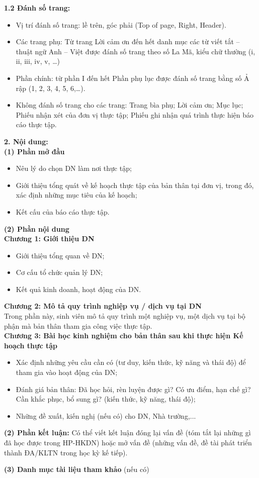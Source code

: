 \documentclass[12pt,a4paper]{article}
\begin{document}
\noindent\textbf{1.2 Đánh số trang:}
\begin{itemize}
    \item[-] Vị trí đánh số trang: lề trên, góc phải (Top of page, Right, Header).
    \item[-] Các trang phụ: Từ trang Lời cảm ơn đến hết danh mục các từ viết tắt – thuật ngữ Anh – Việt được đánh số trang theo số La Mã, kiểu chữ thường (i, ii, iii, iv, v, …)
    \item[-] Phần chính: từ phần I đến hết Phần phụ lục được đánh số trang bằng số Ả rập (1, 2, 3, 4, 5, 6,…).
    \item[-] Không đánh số trang cho các trang: Trang bìa phụ; Lời cảm ơn; Mục lục; Phiếu nhận xét của đơn vị thực tập; Phiếu ghi nhận quá trình thực hiện báo cáo thực tập.
\end{itemize}

\newpage

\noindent\textbf{2. Nội dung:}\\
\textbf{(1) Phần mở đầu}
\begin{itemize}
    \item[$\circ$] Nêu lý do chọn DN làm nơi thực tập;
    \item[$\circ$] Giới thiệu tổng quát về kế hoạch thực tập của bản thân tại đơn vị, trong đó, xác định những mục tiêu của kế hoạch;
    \item[$\circ$] Kết cấu của báo cáo thực tập.
\end{itemize}

\vspace{1em}

\noindent\textbf{(2) Phần nội dung}\\
\textbf{Chương 1: Giới thiệu DN}
\begin{itemize}
    \item[$\circ$] Giới thiệu tổng quan về DN;
    \item[$\circ$] Cơ cấu tổ chức quản lý DN;
    \item[$\circ$] Kết quả kinh doanh, hoạt động của DN.
\end{itemize}
\textbf{Chương 2: Mô tả quy trình nghiệp vụ / dịch vụ tại DN}\\
Trong phần này, sinh viên mô tả quy trình một nghiệp vụ, một dịch vụ tại bộ phận mà bản thân tham gia công việc thực tập.\\
\textbf{Chương 3: Bài học kinh nghiệm cho bản thân sau khi thực hiện Kế hoạch thực tập}
\begin{itemize}
    \item[$\circ$] Xác định những yêu cầu cần có (tư duy, kiến thức, kỹ năng và thái độ) để tham gia vào hoạt động của DN;
    \item[$\circ$] Đánh giá bản thân: Đã học hỏi, rèn luyện được gì? Có ưu điểm, hạn chế gì? Cần khắc phục, bổ sung gì? (kiến thức, kỹ năng, thái độ);
    \item[$\circ$] Những đề xuất, kiến nghị (nếu có) cho DN, Nhà trường,...
\end{itemize}

\vspace{1em}
\noindent\textbf{(2) Phần kết luận:} Có thể viết kết luận đóng lại vấn đề (tóm tắt lại những gì đã học được trong HP-HKDN) hoặc mở vấn đề (những vấn đề, đề tài phát triển thành ĐA/KLTN trong học kỳ kế tiếp).

\vspace{1em}
\noindent\textbf{(3) Danh mục tài liệu tham khảo} (nếu có)
\end{document}
